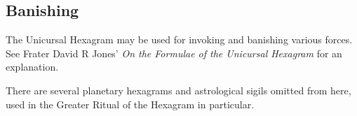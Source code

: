 \subsection*{Banishing}
\begin{center}
\end{center}

The Unicursal Hexagram may be used for invoking and banishing various forces. See Frater David R Jones' \textit{On the Formulae of the Unicursal Hexagram} for an explanation.

There are several planetary hexagrams and astrological sigils omitted from here, used in the Greater Ritual of the Hexagram in particular.
